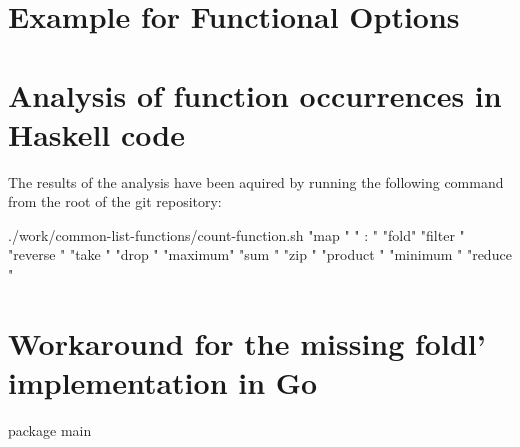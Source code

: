 \documentclass[%
  a4paper,
  twoside,
  numbers=noenddot,
  parskip=half+,
  open=any,
  headsepline,
  english, %
  ba  %
]{zhawthesis}
\newenvironment{code}{\captionsetup{type=listing}}{}
\begin{document}
\backmatter %

\printbibliography

\renewcommand{\lstlistlistingname}{List of source codes}

\lstlistoflistings

\listoffigures

\listoftables
\printglossaries
\cleardoublepage %


\begin{appendices}

\section{Example for Functional Options}\label{appendix:funcopts}
\begin{code}
\end{code}

\section{Analysis of function occurrences in Haskell code}\label{appendix:function-occurrences}
The results of the analysis have been aquired by running the following command
from the root of the git repository\cite{git-repo}:
\begin{bashcode}
./work/common-list-functions/count-function.sh "map " " : " "fold" "filter " "reverse " "take " "drop " "maximum" "sum " "zip " "product " "minimum " "reduce "
\end{bashcode}

\section{Workaround for the missing foldl' implementation in Go}\label{appendix:foldl-go}
\begin{code}
    \label{code:foldl-go}
    \begin{gocode}
package main


\end{gocode}
\end{code}
\end{appendices}
\end{document}
